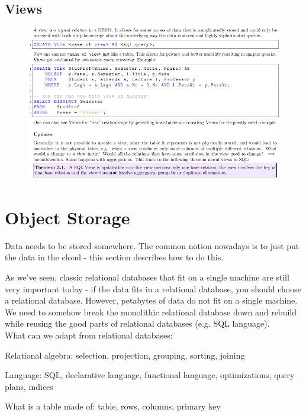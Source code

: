 \documentclass[11pt,oneside,a4paper]{article}
\begin{document}
\subsection{Views}

\vspace{-\topsep}
\begin{figure}[hb!]
	\centering
	\includegraphics[width=1\linewidth]{figures/sql_12}
	\label{fig:sql12}
\end{figure}
\vspace{-\topsep}

\newpage

\section{Object Storage}

Data needs to be stored somewhere. The common notion nowadays is to just put the data in the cloud - this section describes how to do this.

As we've seen, classic relational databases that fit on a single machine are still very important today - if the data fits in a relational database, you should choose a relational database. However, petabytes of data do not fit on a single machine. We need to somehow break the monolithic relational database down and rebuild while reusing the good parts of relational databases (e.g. SQL language).\\

What can we adapt from relational databases:

\begin{compactitem}
	\item Relational algebra: selection, projection, grouping, sorting, joining
	\item Language: SQL, declarative language, functional language, optimizations, query plans, indices
	\item What is a table made of: table, rows, columns, primary key\\
\end{compactitem}
\end{document}
